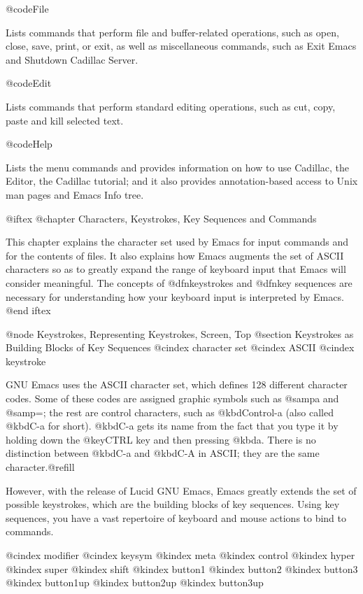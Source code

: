 {{@code{File}

Lists commands that perform file and buffer-related operations, 
such as open, close, save, print, or exit, as well as miscellaneous 
commands, such as Exit Emacs and Shutdown Cadillac Server.

@code{Edit}

Lists commands that perform standard editing operations, such as 
cut, copy, paste and kill selected text. 

@code{Help}

Lists the menu commands and provides information on how to use 
Cadillac, the Editor, the Cadillac tutorial; and it also provides 
annotation-based access to Unix man pages and Emacs Info tree.   

@iftex
@chapter Characters, Keystrokes, Key Sequences and Commands

  This chapter explains the character set used by Emacs for input
commands and for the contents of files. It also explains how Emacs
augments the set of ASCII characters so as to greatly expand the
range of keyboard input that Emacs will consider meaningful.
The concepts of @dfn{keystrokes} and @dfn{key sequences} 
are necessary for understanding
how your keyboard input is interpreted by Emacs.
@end iftex

@node Keystrokes, Representing Keystrokes, Screen, Top
@section Keystrokes as Building Blocks of Key Sequences
@cindex character set
@cindex ASCII
@cindex keystroke

    GNU Emacs uses the ASCII character set, which defines 128 different
character codes.  Some of these codes are assigned graphic symbols such
as @samp{a} and @samp{=}; the rest are control characters, such as
@kbd{Control-a} (also called @kbd{C-a} for short).  @kbd{C-a} gets its name
from the fact that you type it by holding down the @key{CTRL} key and
then pressing @kbd{a}.  There is no distinction between @kbd{C-a} and
@kbd{C-A} in ASCII; they are the same character.@refill

   However, with the release of Lucid GNU Emacs, Emacs greatly extends
the set of possible keystrokes, which are the building blocks of
key sequences. Using key sequences, you have a vast repertoire of
keyboard and mouse actions to bind to commands.
  
@cindex modifier
@cindex keysym
@kindex meta
@kindex control
@kindex hyper
@kindex super
@kindex shift
@kindex button1
@kindex button2
@kindex button3
@kindex button1up
@kindex button2up
@kindex button3up

}}
